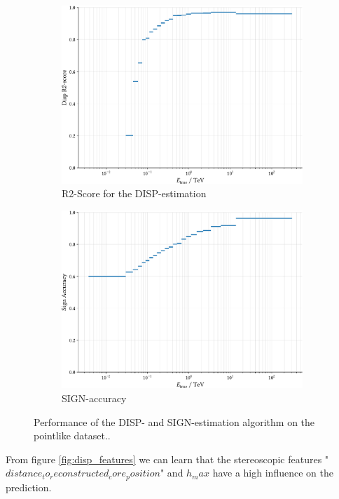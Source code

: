 \begin{figure}
    \begin{subfigure}{0.45\textwidth}
        \includegraphics[width=0.9\linewidth]{../analysis/plots/disp_gamma_r2_equal_filled.pdf} 
        \caption{R2-Score for the DISP-estimation}
    \end{subfigure}
    \begin{subfigure}{0.45\textwidth}
        \includegraphics[width=0.9\linewidth]{../analysis/plots/disp_gamma_acc_equal_filled.pdf}
        \caption{SIGN-accuracy}
    \end{subfigure}
    \caption{Performance of the DISP- and SIGN-estimation algorithm on the pointlike dataset..}
    \label{fig:disp_gamma_perf}
\end{figure}

From figure \ref{fig:disp_features} we can learn that 
the stereoscopic features "$distance_to_reconstructed_core_position$"
and $h_max$ have a high influence on the prediction.


